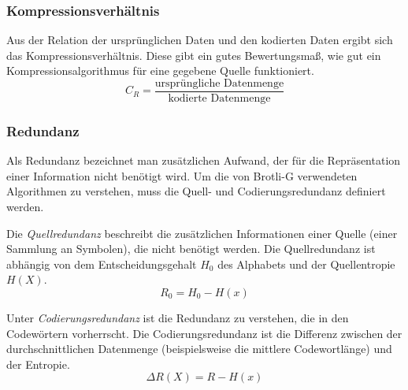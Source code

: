 \subsubsection*{Kompressionsverhältnis}
Aus der Relation der ursprünglichen Daten und den kodierten Daten ergibt sich das Kompressionsverhältnis.
Diese gibt ein gutes Bewertungsmaß, wie gut ein Kompressionsalgorithmus für eine gegebene Quelle funktioniert.
\begin{equation*}
C_R = \frac{\text{ursprüngliche Datenmenge}}{\text{kodierte Datenmenge}}
\end{equation*}

\subsubsection*{Redundanz}
Als Redundanz bezeichnet man zusätzlichen Aufwand, der für die Repräsentation einer Information nicht benötigt wird.
Um die von Brotli-G verwendeten Algorithmen zu verstehen, muss die Quell- und Codierungsredundanz definiert werden.

Die \textit{Quellredundanz} beschreibt die zusätzlichen Informationen einer Quelle (einer Sammlung an Symbolen), die nicht benötigt werden.
Die Quellredundanz ist abhängig von dem Entscheidungsgehalt $\mathit{H_0}$ des Alphabets und der Quellentropie $\mathit{H(X)}$.
\begin{equation*}
R_0 = H_0 - H(x)
\end{equation*}

Unter \textit{Codierungsredundanz} ist die Redundanz zu verstehen, die in den Codewörtern vorherrscht.
Die Codierungsredundanz ist die Differenz zwischen der durchschnittlichen Datenmenge (beispielsweise die mittlere Codewortlänge) und der Entropie.
\begin{equation*}
\Delta R(X) = R - H(x)
\end{equation*}

\cite{Strutz2009}